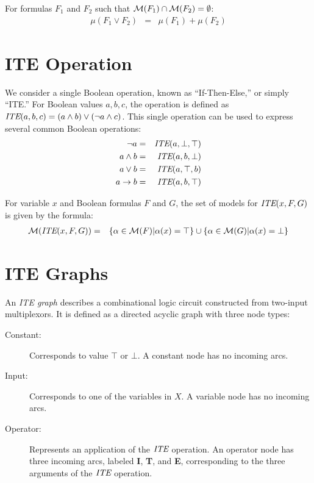 \documentclass{llncs}
\newcommand{\tautology}{\top}
\newcommand{\nil}{\bot}
\newcommand{\ite}{\mbox{\it ITE}}
\newcommand{\interp}{\alpha}
\newcommand{\interpset}[1]{{\cal M}(#1)}
\newcommand{\mcount}{\mu}
\newcommand{\ifarg}{\textbf{I}}
\newcommand{\thenarg}{\textbf{T}}
\newcommand{\elsearg}{\textbf{E}}
\begin{document}
\begin{lemma}
  \label{lemma:sum}
  For formulas $F_1$ and $F_2$ such that $\interpset{F_1} \cap \interpset{F_2} = \emptyset$:
  \begin{eqnarray*}
    \mcount(F_1 \lor F_2) &=& \mcount(F_1) + \mcount(F_2)
  \end{eqnarray*}
\end{lemma}

\section{ITE Operation}

We consider a single Boolean operation, known as
``If-Then-Else,'' or simply ``ITE.''  For Boolean values $a, b, c$,
the operation is defined as $\ite(a,b,c) = (a \land b) \lor (\neg a
\land c)$.  This single operation can be used to express several common Boolean operations:
\begin{eqnarray*}
\neg a & = & \ite(a, \nil, \tautology) \\
a \land b & = & \ite(a, b, \nil) \\
a \lor b & = & \ite(a, \tautology, b) \\
a \rightarrow b & = & \ite(a, b, \tautology) \\
\end{eqnarray*}  

For variable $x$ and Boolean formulas $F$ and $G$, the set of models
for $\ite(x, F, G)$ is given by the formula:
\begin{eqnarray}
  \interpset{\ite(x, F, G)} & = & \{ \interp \in \interpset{F} | \interp(x) = \tautology \}
  \cup \{ \interp \in \interpset{G} | \interp(x) = \nil \} \label{eqn:ite:interp}
\end{eqnarray}

\section{ITE Graphs}

An {\em ITE graph} describes a combinational logic circuit constructed from two-input multiplexors.
It is defined as a directed acyclic graph
with three node types:
\begin{description}
\item[Constant:] Corresponds to value $\tautology$ or $\nil$.  A constant node has no incoming arcs.
\item[Input:] Corresponds to one of the variables in $X$.   A variable node has no incoming arcs.
\item[Operator:] Represents an application of the $\ite$ operation.  An operator node has three incoming arcs, labeled \ifarg{}, \thenarg{}, and \elsearg{}, corresponding to the three arguments of the $\ite$ operation.
\end{description}  
\end{document}
